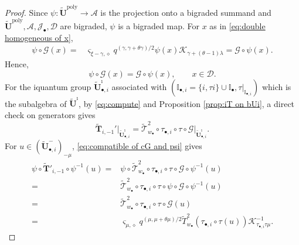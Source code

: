 \documentclass[a4paper,reqno,12pt]{amsart}
\numberwithin{equation}{section}
\theoremstyle{definition}
\theoremstyle{plain}
\theoremstyle{definition}
\def\I{\mathbb I}
\def\bI{\I_\bullet}
\def\bIi{\I_{\bullet,i}}
\def\bw{w_\bullet}
\def\tU{\widetilde{\mathbf U}}
\def\tUi{\widetilde{\mathbf U}^{\imath}}
\def \tbiU{\tU_{\bullet,i}}
\def\tTD{\widetilde T}
\def\tT{\widetilde{\mathscr T}}
\def\tTT{\widetilde{\mathbf T}}
\def\cA{\mathcal A}
\def\cJ{\mathcal J}
\def\cK{\mathcal K}
\def\cD{\mathcal D}
\def\cG{\mathcal G}
\def\vs{\varsigma}
\def\dm{\diamond}
\newcommand{\tTa}[1]{\tTT'_{#1,-1}}
\newcommand{\poly}{\mathrm{poly}}
\begin{document}
\begin{proof}
 Since $\psi:\tU^\poly\rightarrow\cA$ is the projection onto a bigraded summand and $\tU^\poly,\cA,\cJ_\bullet,\cD$ are bigraded, $\psi$ is a bigraded map. For $x$ as in \eqref{eq:double homogeneous of x},
 \begin{align*}
     \psi\circ\cG(x)=&\vs_{\xi-\gamma,\dm}q^{(\gamma,\gamma+\theta \gamma)/2}\psi(x)\cK_{\gamma+(\theta-1)\lambda}
     =\cG\circ\psi(x).
 \end{align*}
 Hence,
 \begin{equation}\label{eq:compatible of cG and psi}
     \psi\circ\cG(x)=\cG\circ\psi(x),\qquad x\in\cD.
 \end{equation}
 For the iquantum group $\tbiU^\imath$ associated with $(\bIi=\{i,\tau i\}\cup\bI,\tau|_{\bIi})$ which is the subalgebra of $\tUi$, by \eqref{eq:compute} and Proposition \ref{prop:iT on bUi}, a direct check on generators gives
 \begin{equation}\label{eq:local-T}
     \tTT_{i,-1}'\big|_{\tbiU^\imath}=\tT_{\bw}^2\circ\tau_{\bullet,i}\circ\tau\circ\cG\big|_{\tbiU^\imath}.
 \end{equation}
 For $u\in(\tbiU^-)_{-\mu}$, \eqref{eq:compatible of cG and psi} gives
 \begin{align*}
     \psi\circ\tTa{i}\circ\psi^{-1}(u)=&\psi\circ\tT_{\bw}^2\circ\tau_{\bullet,i}\circ\tau\circ\cG\circ\psi^{-1}(u)\\
     =&\tT_{\bw}^2\circ\tau_{\bullet,i}\circ\tau\circ\psi\circ\cG\circ\psi^{-1}(u)\\
     =&\tT_{\bw}^2\circ\tau_{\bullet,i}\circ\tau\circ\cG(u)\\
     =&\vs_{\mu,\dm}q^{(\mu,\mu+\theta\mu)/2}\tTD_{\bw}^2(\tau_{\bullet,i}\circ\tau(u))\cK_{\tau_{\bullet,i}\tau \mu}^{-1}.
 \end{align*}
\end{proof}
\fi
\end{document}
